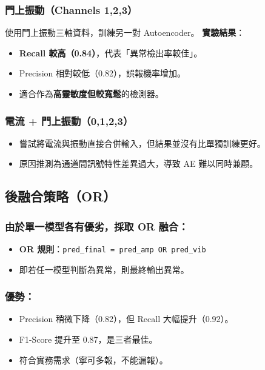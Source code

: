 \documentclass[12pt,a4paper]{article}
\begin{document}
\subsubsection{門上振動（Channels 1,2,3）}

使用門上振動三軸資料，訓練另一對 Autoencoder。
\textbf{實驗結果}：

\begin{itemize}
    \item \textbf{Recall 較高（0.84）}，代表「異常檢出率較佳」。
    \item Precision 相對較低（0.82），誤報機率增加。
    \item 適合作為\textbf{高靈敏度但較寬鬆}的檢測器。
\end{itemize}

\subsubsection{電流 + 門上振動（0,1,2,3）}

\begin{itemize}
    \item 嘗試將電流與振動直接合併輸入，但結果並沒有比單獨訓練更好。
    \item 原因推測為通道間訊號特性差異過大，導致 AE 難以同時兼顧。
\end{itemize}

\subsection{後融合策略（OR）}

\subsubsection{由於單一模型各有優劣，採取 OR 融合：}

\begin{itemize}
    \item \textbf{OR 規則}：\texttt{pred\_final = pred\_amp OR pred\_vib}
    \item 即若任一模型判斷為異常，則最終輸出異常。
\end{itemize}

\subsubsection{優勢：}

\begin{itemize}
    \item Precision 稍微下降（0.82），但 Recall 大幅提升（0.92）。
    \item F1-Score 提升至 0.87，是三者最佳。
    \item 符合實務需求（寧可多報，不能漏報）。
\end{itemize}
\end{document}
